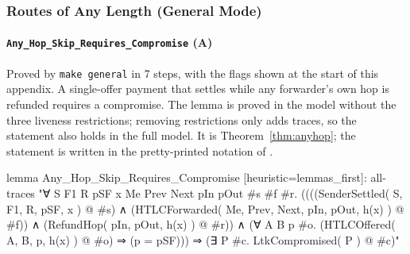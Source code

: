 \subsubsection{Routes of Any Length (General Mode)}

\paragraph{\texttt{Any\_Hop\_Skip\_Requires\_Compromise} (A)}
Proved by \texttt{make general} in 7 steps, with the flags shown at the start of this
appendix. A single-offer payment that settles while any
forwarder's own hop is refunded requires a compromise. The lemma is proved in the model without
the three liveness restrictions; removing restrictions only adds traces, so the statement also
holds in the full model. It is Theorem~\ref{thm:anyhop}; the statement is written in the
pretty-printed notation of \tamarin{}.
\begin{spthy}
lemma Any_Hop_Skip_Requires_Compromise [heuristic={lemmas_first}]:
  all-traces
  "∀ S F1 R pSF x Me Prev Next pIn pOut #s #f #r.
    ((((SenderSettled( S, F1, R, pSF, x ) @ #s) ∧
       (HTLCForwarded( Me, Prev, Next, pIn, pOut, h(x) ) @ #f)) ∧
      (RefundHop( pIn, pOut, h(x) ) @ #r)) ∧
     (∀ A B p #o. (HTLCOffered( A, B, p, h(x) ) @ #o) ⇒ (p = pSF))) ⇒
    (∃ P #c. LtkCompromised( P ) @ #c)"
\end{spthy}

